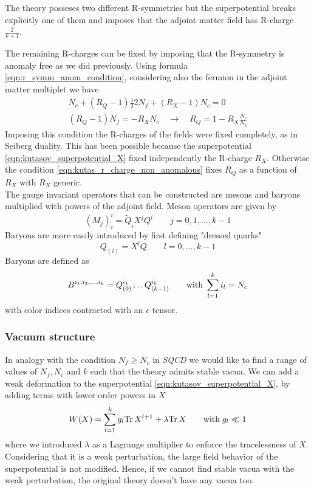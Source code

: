 The theory posseses two different R-symmetries but the superpotential breaks explicitly one of them and imposes that the adjoint matter field has R-charge $\frac{2}{k+1}$.

The remaining R-charges can be fixed by imposing that the R-symmetry is anomaly free as we did previously.
Using formula \eqref{eqn:r_symm_anom_condition}, considering also the fermion in the adjoint matter multiplet we have
\begin{equation}
\begin{aligned}
N_c + (R_Q -1) \frac{1}{2} 2 N_f + (R_X - 1 ) N_c = 0 
\label{eqn:kutas_r_charge_non_anomalous}
\\
(R_Q - 1 ) N_f = - R_X N_c \quad \longrightarrow \quad R_Q = 1 - R_X \frac{N_c}{N_f}
\end{aligned}
\end{equation}
Imposing this condition the R-charges of the fields were fixed completely, as in Seiberg duality.
This has been possible because the superpotential 
\eqref{eqn:kutasov_superpotential_X}
fixed independently the R-charge $R_X$.
Otherwise the condition \eqref{eqn:kutas_r_charge_non_anomalous} fixes $R_Q$ as a function of $R_X$ with $R_X$ generic.
\\
The gauge invariant operators that can be constructed are mesons and baryons multiplied with powers of the adjoint field.
Meson operators are given by
\begin{equation}
 (M_j)^i_{\tilde{i}} = \tilde{Q}_{\tilde{i}} X^{j} Q^i \qquad j = 0,1,\dotsc,k-1
\end{equation}
Baryons are more easily introduced by first defining "dressed quarks"
\begin{equation}
 Q_{(l)} = X^{l} Q \qquad l =0, \dotsc, k-1
\end{equation}
Baryons are defined as
\begin{equation}
B^{i_1, i_2, \dotsc , i_k} = Q_{(0)}^{i_1} \dots Q_{(k-1)}^{i_k} \qquad \hbox{with} \; \sum_{l=1}^k i_l = N_c 
\end{equation}
with color indices contracted with an $\epsilon$ tensor.


\subsubsection{Vacuum structure}
\label{sec:kutasov_vacuum_struct_deformed}
In analogy with the condition $N_f \geq N_c$ in \emph{SQCD} we would like to find a range of values of $N_f,N_c$ and $k$ such that the theory admits stable vacua.  
We can add a weak deformation to the superpotential \eqref{eqn:kutasov_superpotential_X}, by adding terms with lower order powers in $X$
\begin{equation}
W(X) = \sum_{l=1}^k g_l  \mathrm{Tr } \, X^{l+1} + \lambda \mathrm{Tr } \, X \qquad \hbox{with} \; g_l \ll 1
\label{eqn:kutasov_deformed_superpotential}
\end{equation}
where we introduced $\lambda$ as a Lagrange multiplier to enforce the tracelessness of $X$.
Considering that it is a weak perturbation, the large field behavior of the superpotential is not modified.
Hence, if we cannot find stable vacua with the weak perturbation, the original theory doesn't have any vacua too. 

